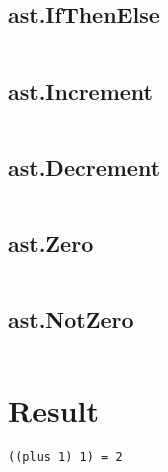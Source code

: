 \documentclass[11pt, numbers=endperiod, parskip=half]{scrartcl}
\begin{document}
\subsection{ast.IfThenElse}
\inputminted[tabsize=2]{java}{LCLParser/src/ast/IfThenElse.java}

\subsection{ast.Increment}
\inputminted[tabsize=2]{java}{LCLParser/src/ast/Increment.java}

\subsection{ast.Decrement}
\inputminted[tabsize=2]{java}{LCLParser/src/ast/Decrement.java}

\subsection{ast.Zero}
\inputminted[tabsize=2]{java}{LCLParser/src/ast/Zero.java}

\subsection{ast.NotZero}
\inputminted[tabsize=2]{java}{LCLParser/src/ast/NotZero.java}

\restoregeometry
\section{Result}
\begin{verbatim}
((plus 1) 1) = 2
\end{verbatim}
\end{document}
